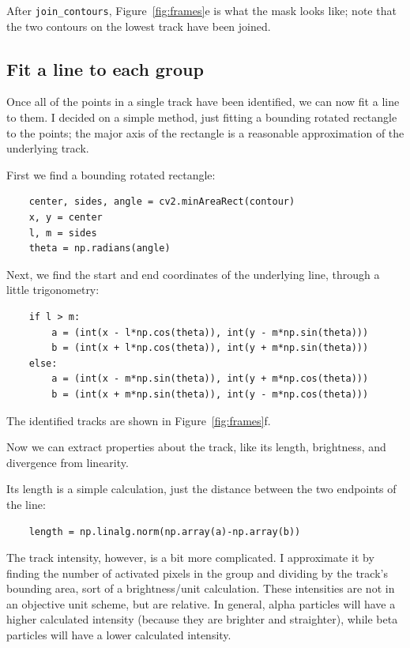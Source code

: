 \documentclass[notitlepage,12pt]{article}
\begin{document}
After \texttt{join\_contours}, Figure~\ref{fig:frames}e is what the mask looks like; note that the two contours on the lowest track have been joined.

\subsection{Fit a line to each group}

Once all of the points in a single track have been identified, we can now fit a line to them.  I decided on a simple method, just fitting a bounding rotated rectangle to the points; the major axis of the rectangle is a reasonable approximation of the underlying track.

First we find a bounding rotated rectangle:
\begin{lstlisting}
    center, sides, angle = cv2.minAreaRect(contour)
    x, y = center
    l, m = sides
    theta = np.radians(angle)
\end{lstlisting}

Next, we find the start and end coordinates of the underlying line, through a little trigonometry:
\begin{lstlisting}
    if l > m:
        a = (int(x - l*np.cos(theta)), int(y - m*np.sin(theta)))
        b = (int(x + l*np.cos(theta)), int(y + m*np.sin(theta)))
    else:
        a = (int(x - m*np.sin(theta)), int(y + m*np.cos(theta)))
        b = (int(x + m*np.sin(theta)), int(y - m*np.cos(theta)))
\end{lstlisting}

The identified tracks are shown in Figure~\ref{fig:frames}f.

Now we can extract properties about the track, like its length, brightness, and divergence from linearity.

Its length is a simple calculation, just the distance between the two endpoints of the line:
\begin{lstlisting}
    length = np.linalg.norm(np.array(a)-np.array(b))
\end{lstlisting}    

The track intensity, however, is a bit more complicated.  I approximate it by finding the number of activated pixels in the group and dividing by the track's bounding area, sort of a brightness/unit calculation.  These intensities are not in an objective unit scheme, but are relative.  In general, alpha particles will have a higher calculated intensity (because they are brighter and straighter), while beta particles will have a lower calculated intensity.
\end{document}
